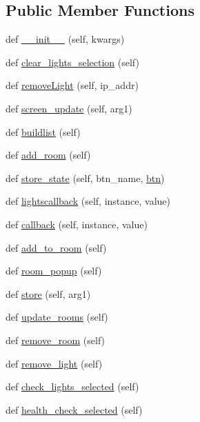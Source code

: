 \subsection*{Public Member Functions}
\begin{DoxyCompactItemize}
\item 
def \hyperlink{classGUI8-5pm_1_1LightsView_ae7d1c4d9cd3566fbd34b713f8d06d1b4}{\+\_\+\+\_\+init\+\_\+\+\_\+} (self, kwargs)
\item 
def \hyperlink{classGUI8-5pm_1_1LightsView_a196136b601af21b35ffa189b52a28c74}{clear\+\_\+lights\+\_\+selection} (self)
\item 
def \hyperlink{classGUI8-5pm_1_1LightsView_a1d8b802d5743ef92638ca488d6c4206b}{remove\+Light} (self, ip\+\_\+addr)
\item 
def \hyperlink{classGUI8-5pm_1_1LightsView_ac67898155faa2ecb2b37af789d4c5da8}{screen\+\_\+update} (self, arg1)
\item 
def \hyperlink{classGUI8-5pm_1_1LightsView_a9e6508b45e002823583b6b3d875bbaa1}{buildlist} (self)
\item 
def \hyperlink{classGUI8-5pm_1_1LightsView_a19236998dfed9a4c815ff47ff3ffdecd}{add\+\_\+room} (self)
\item 
def \hyperlink{classGUI8-5pm_1_1LightsView_aa14040d56fccdb0f91679a01e251ee36}{store\+\_\+state} (self, btn\+\_\+name, \hyperlink{classGUI8-5pm_1_1LightsView_a28bbef7d59d31653b776afd6fcccced6}{btn})
\item 
def \hyperlink{classGUI8-5pm_1_1LightsView_a4a0a8fa02aeb8ddd84fb3ac23350ccf7}{lightscallback} (self, instance, value)
\item 
def \hyperlink{classGUI8-5pm_1_1LightsView_abc262678a2d3186a3f6ee4b404e850bf}{callback} (self, instance, value)
\item 
def \hyperlink{classGUI8-5pm_1_1LightsView_a300f633bf532a37870f3959b3ac0cb3c}{add\+\_\+to\+\_\+room} (self)
\item 
def \hyperlink{classGUI8-5pm_1_1LightsView_a8dfdd625d3c5032e54c3b90266fade52}{room\+\_\+popup} (self)
\item 
def \hyperlink{classGUI8-5pm_1_1LightsView_a1e827d0382e8dc3331a8cb708151d136}{store} (self, arg1)
\item 
def \hyperlink{classGUI8-5pm_1_1LightsView_aefbf28acef5785ce3d4760b783d5f0b8}{update\+\_\+rooms} (self)
\item 
def \hyperlink{classGUI8-5pm_1_1LightsView_a974c9728a6ae53f1da87c96d3c4bde7f}{remove\+\_\+room} (self)
\item 
def \hyperlink{classGUI8-5pm_1_1LightsView_aab2843fb2c86a3a872bc419017d55471}{remove\+\_\+light} (self)
\item 
def \hyperlink{classGUI8-5pm_1_1LightsView_aeaad3431cc072b951752b97515965bbb}{check\+\_\+lights\+\_\+selected} (self)
\item 
def \hyperlink{classGUI8-5pm_1_1LightsView_adfc085a1d001f6a9b6f92238fdc64804}{health\+\_\+check\+\_\+selected} (self)
\end{DoxyCompactItemize}
